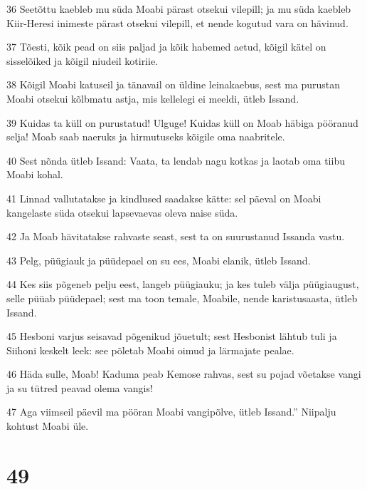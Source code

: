 \par 36 Seetõttu kaebleb mu süda Moabi pärast otsekui vilepill; ja mu süda kaebleb Kiir-Heresi inimeste pärast otsekui vilepill, et nende kogutud vara on hävinud.
\par 37 Tõesti, kõik pead on siis paljad ja kõik habemed aetud, kõigil kätel on sisselõiked ja kõigil niudeil kotiriie.
\par 38 Kõigil Moabi katuseil ja tänavail on üldine leinakaebus, sest ma purustan Moabi otsekui kõlbmatu astja, mis kellelegi ei meeldi, ütleb Issand.
\par 39 Kuidas ta küll on purustatud! Ulguge! Kuidas küll on Moab häbiga pööranud selja! Moab saab naeruks ja hirmutuseks kõigile oma naabritele.
\par 40 Sest nõnda ütleb Issand: Vaata, ta lendab nagu kotkas ja laotab oma tiibu Moabi kohal.
\par 41 Linnad vallutatakse ja kindlused saadakse kätte: sel päeval on Moabi kangelaste süda otsekui lapsevaevas oleva naise süda.
\par 42 Ja Moab hävitatakse rahvaste seast, sest ta on suurustanud Issanda vastu.
\par 43 Pelg, püügiauk ja püüdepael on su ees, Moabi elanik, ütleb Issand.
\par 44 Kes siis põgeneb pelju eest, langeb püügiauku; ja kes tuleb välja püügiaugust, selle püüab püüdepael; sest ma toon temale, Moabile, nende karistusaasta, ütleb Issand.
\par 45 Hesboni varjus seisavad põgenikud jõuetult; sest Hesbonist lähtub tuli ja Siihoni keskelt leek: see põletab Moabi oimud ja lärmajate pealae.
\par 46 Häda sulle, Moab! Kaduma peab Kemose rahvas, sest su pojad võetakse vangi ja su tütred peavad olema vangis!
\par 47 Aga viimseil päevil ma pööran Moabi vangipõlve, ütleb Issand.” Niipalju kohtust Moabi üle.

\chapter{49}

